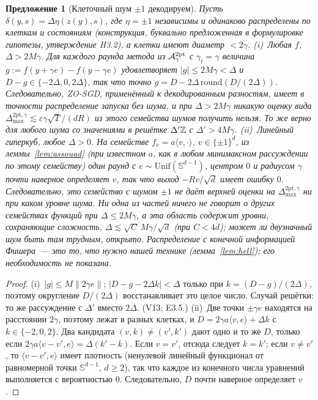 \documentclass[11pt,a4paper]{article}
\numberwithin{equation}{section}
\newtheorem{proposition}[theorem]{Предложение}
\theoremstyle{definition}
\theoremstyle{remark}
\newcommand{\norm}[1]{\lVert #1\rVert}\newcommand{\abs}[1]{\lvert #1\rvert}\newcommand{\ip}[2]{\langle #1,#2\rangle}
\newcommand{\Dmax}{\Delta_{\max}}\newcommand{\Dcp}{\Delta_{\rm cp}}\newcommand{\Dlow}{\Delta_{\rm low}}
\newcommand{\Unif}{\mathrm{Unif}}\newcommand{\TV}{\mathrm{TV}}\newcommand{\BC}{\mathrm{BC}}\newcommand{\tmix}{t_{\rm mix}}
\newcommand{\Sph}{\mathbb S^{d-1}}\newcommand{\Ball}{\mathbb B}\newcommand{\iid}{\mathrm{iid}}
\begin{document}
\begin{proposition}[Клеточный шум $\pm1$ декодируем]\label{prop:pm1}
Пусть $\delta(y,s)=\Delta\eta(z(y),s)$, где $\eta=\pm1$ независимы и одинаково распределены по клеткам и состояниям (конструкция, буквально предложенная в формулировке гипотезы, утверждение H3.2), а клетки имеют диаметр $<2\gamma$.
(i)~\emph{Любая $f$, $\Delta>2M\gamma$.} Для каждого раунда метода из $\mathcal A^{\rm 2pt}_\gamma$ с $\gamma_t=\gamma$ величина $g:=f(y+\gamma e)-f(y-\gamma e)$ удовлетворяет $\abs g\le2M\gamma<\Delta$ и $D-g\in\{-2\Delta,0,2\Delta\}$, так что точно $g=D-2\Delta\,\mathrm{round}(D/(2\Delta))$. Следовательно, ZO-SGD, применённый к декодированным разностям, имеет в точности распределение запуска без шума, и при $\Delta>2M\gamma$ никакую оценку вида $\Dmax^{\mathrm{2pt},\gamma}\lesssim\varepsilon\gamma\sqrt T/(dR)$ из этого семейства шумов получить нельзя. То же верно для любого шума со значениями в решётке $\Delta'\mathbb Z$ с $\Delta'>4M\gamma$.
(ii)~\emph{Линейный гиперкуб, любое $\Delta>0$.} На семействе $f_v=a\ip v\cdot$, $v\in\{\pm1\}^d$, из леммы~\ref{lem:assouad} (при известном $a$, как в любом минимаксном рассуждении по этому семейству) один раунд с $e\sim\Unif(\Sph)$, центром $0$ и радиусом $\gamma$ почти наверное определяет $v$, так что выход $-Rv/\sqrt d$ имеет ошибку $0$. Следовательно, это семейство с шумом $\pm1$ не даёт верхней оценки на $\Dmax^{\mathrm{2pt},\gamma}$ ни при каком уровне шума.
Ни одна из частей ничего не говорит о других семействах функций при $\Delta\le2M\gamma$, а эта область содержит уровни, сохраняющие сложность, $\Delta\lesssim\sqrt C\,M\gamma/\sqrt d$ (при $C<4d$); может ли двузначный шум быть там трудным, открыто. Распределение с конечной информацией Фишера~--- это то, что нужно \emph{нашей} технике (лемма~\ref{lem:hell}); его необходимость не показана.
\end{proposition}
\begin{proof}
(i)~$\abs g\le M\norm{2\gamma e}$; $\abs{D-g-2\Delta k}<\Delta$ только при $k=(D-g)/(2\Delta)$, поэтому округление $D/(2\Delta)$ восстанавливает это целое число. Случай решётки: то же рассуждение с $\Delta'$ вместо $2\Delta$. (V13; E3.5.)
(ii)~Две точки $\pm\gamma e$ находятся на расстоянии $2\gamma$, поэтому лежат в разных клетках, и $D=2\gamma a\ip ve+\Delta k$ с $k\in\{-2,0,2\}$. Два кандидата $(v,k)\ne(v',k')$ дают одно и то же $D$, только если $2\gamma a\ip{v-v'}e=\Delta(k'-k)$. Если $v=v'$, отсюда следует $k=k'$; если $v\ne v'$, то $\ip{v-v'}e$ имеет плотность (ненулевой линейный функционал от равномерной точки $\Sph$, $d\ge2$), так что каждое из конечного числа уравнений выполняется с вероятностью $0$. Следовательно, $D$ почти наверное определяет $v$.
\end{proof}
\end{document}
